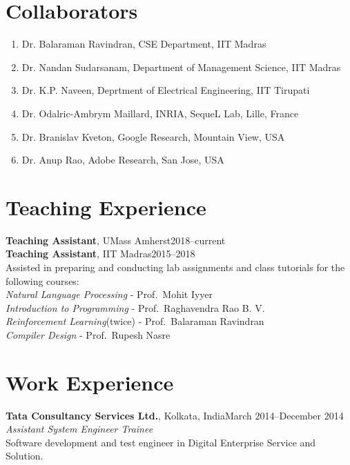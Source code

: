\documentclass[margin,11pt]{res}
\begin{document}
\begin{resume}
\section{Collaborators}
\begin{enumerate}
\item Dr. Balaraman Ravindran, CSE Department, IIT Madras
\item Dr. Nandan Sudarsanam, Department of Management Science, IIT Madras
\item Dr. K.P. Naveen, Deprtment of Electrical Engineering, IIT Tirupati
\item Dr. Odalric-Ambrym Maillard, INRIA, SequeL Lab, Lille, France
\item Dr. Branislav Kveton, Google Research, Mountain View, USA
\item Dr. Anup Rao, Adobe Research, San Jose, USA
\end{enumerate}

\section{Teaching Experience}
\par
\textbf{Teaching Assistant}, UMass Amherst\hfill 2018--current\\
\textbf{Teaching Assistant}, IIT Madras\hfill 2015--2018\\
Assisted in preparing and conducting lab assignments and class tutorials for the following courses:\\
\textit{Natural Language Processing} - Prof.~Mohit Iyyer\\
\textit{Introduction to Programming} - Prof.~Raghavendra Rao B. V. \\
\textit{Reinforcement Learning}(twice) - Prof.~Balaraman Ravindran\\
\textit{Compiler Design} - Prof.~Rupesh Nasre

\section{Work Experience}
\textbf{Tata Consultancy Services Ltd.}, Kolkata, India\hfill March 2014--December 2014\\
\textit{Assistant System Engineer Trainee}\\
Software development and test engineer in Digital Enterprise Service and Solution.



\end{resume}
\end{document}
